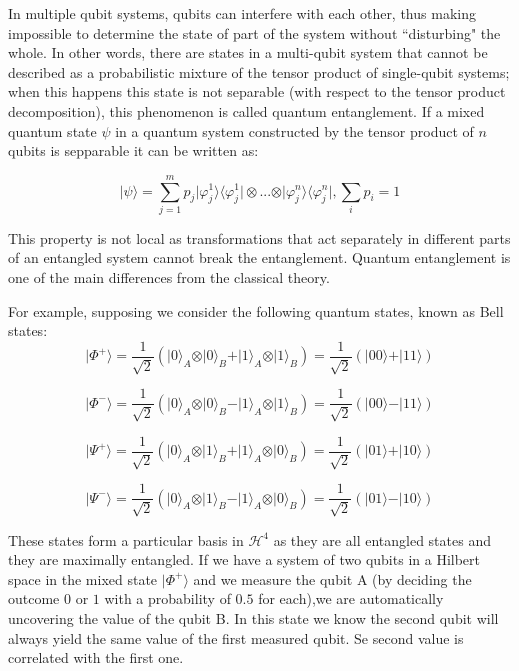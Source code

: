 In multiple qubit systems, qubits can interfere with each other, thus making impossible to determine the state of part of the system without ``disturbing" the whole. In other words, there are states in a multi-qubit system that cannot be described as a probabilistic mixture of the tensor product of single-qubit systems; when this happens this state is not separable (with respect to the tensor product decomposition), this phenomenon is called quantum entanglement\cite{Rieffel2011}. If a mixed quantum state $\psi$ in a quantum system constructed by the tensor product of $n$ qubits is sepparable it can be written as:

\begin{equation}
\vert\psi\rangle= \sum^m_{j=1}{p_{j}\vert\varphi_{j}^{1}\rangle\langle\varphi_{j}^{1}\vert \otimes ... \otimes \vert\varphi_{j}^{n}\rangle\langle\varphi_{j}^{n}\vert}, \sum_{i}{p_{i}}=1
\end{equation}

This property is not local as transformations that act separately in different parts of an entangled system cannot break the entanglement. Quantum entanglement is one of the main differences from the classical theory\cite{Rieffel2011}.

For example, supposing we consider the following quantum states, known as Bell states:
\begin{equation}
\vert\Phi^{+}\rangle=\frac{1}{\sqrt{2}}(\vert0\rangle_{A} \otimes\vert0\rangle_{B} +\vert1\rangle_{A} \otimes\vert1\rangle_{B})=\frac{1}{\sqrt{2}}(\vert00\rangle+\vert11\rangle)
\end{equation}

\begin{equation}
\vert\Phi^{-}\rangle=\frac{1}{\sqrt{2}}(\vert0\rangle_{A} \otimes\vert0\rangle_{B} -\vert1\rangle_{A} \otimes\vert1\rangle_{B})=\frac{1}{\sqrt{2}}(\vert00\rangle-\vert11\rangle)
\end{equation}

\begin{equation}
\vert\Psi^{+}\rangle=\frac{1}{\sqrt{2}}(\vert0\rangle_{A} \otimes\vert1\rangle_{B} +\vert1\rangle_{A}\otimes\vert0\rangle_{B})=\frac{1}{\sqrt{2}}(\vert01\rangle+\vert10\rangle)
\end{equation}

\begin{equation}
\vert\Psi^{-}\rangle=\frac{1}{\sqrt{2}}(\vert0\rangle_{A} \otimes\vert1\rangle_{B} -\vert1\rangle_{A} \otimes\vert0\rangle_{B})=\frac{1}{\sqrt{2}}(\vert01\rangle-\vert10\rangle)
\end{equation}

These states form a particular basis in $\mathcal{H}^4$ as they are all entangled states and they are maximally entangled. If we have a system of two qubits in a Hilbert space in the mixed state $\vert\Phi^{+}\rangle$ and we measure the qubit A (by deciding the outcome $0$ or $1$ with a probability of $0.5$ for each),we are automatically uncovering the value of the qubit B. In this state we know the second qubit will always yield the same value of the first measured qubit. Se second value is correlated with the first one.



